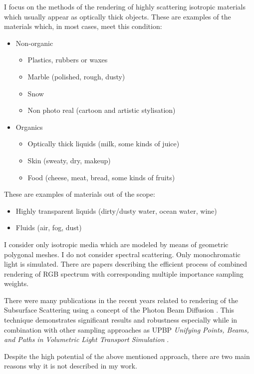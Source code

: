 I focus on the methods of the rendering of highly scattering isotropic materials which usually
appear as optically thick objects. These are examples of the materials which, in most cases, meet
this condition:
\begin{itemize}
    \item Non-organic
    \begin{itemize}
        \item Plastics, rubbers or waxes
        \item Marble (polished, rough, dusty)
        \item Snow
        \item Non photo real (cartoon and artistic stylisation)
    \end{itemize}
    \item Organics
    \begin{itemize}
    \item Optically thick liquids (milk, some kinds of juice)
        \item Skin (sweaty, dry, makeup)
        \item Food (cheese, meat, bread, some kinds of fruits)
    \end{itemize}
\end{itemize}
These are examples of materials out of the scope:
\begin{itemize}
    \item Highly transparent liquids (dirty/dusty water, ocean water, wine)
    \item Fluids (air, fog, dust)
\end{itemize}
I consider only isotropic media which are modeled by means of geometric
polygonal meshes. I do not consider spectral scattering. Only monochromatic light is simulated.
There are papers describing the efficient process of combined rendering of RGB spectrum with
corresponding multiple importance sampling weights.

There were many publications in the recent years related to rendering of the Subsurface Scattering
using a concept of the Photon Beam Diffusion \cite{Habel:2013:PBD:2600890.2600896}. This technique
demonstrates significant results and robustness especially while in combination with other
sampling approaches as UPBP \emph{Unifying Points, Beams, and Paths in Volumetric Light Transport
Simulation} \cite{krivanek14upbp}.

Despite the high potential of the above mentioned approach, there are two main reasons why it is not
described in my work.

